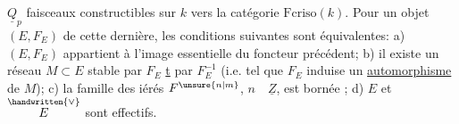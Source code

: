 
$\underline{Q}_p$ faisceaux constructibles sur $k$ vers la catégorie $\mathrm{Fcriso}(k)$. Pour un objet $(E,F_E)$ de cette dernière, les conditions suivantes sont équivalentes: a) $(E,F_E)$ appartient à l'image essentielle du foncteur précédent; b) il existe un réseau $M\subset E$ stable par $F_E$  \uline{t} par $F_E^{-1}$ (i.e. tel que $F_E$ induise un \uline{automorphisme} de $M$); c) la famille des iérés $F^{\unsure{n|m}}$, $n\quad\underline{Z}$, est bornée ; d) $E$ et $\overset{\handwritten{\vee}}{E}$ sont effectifs.

